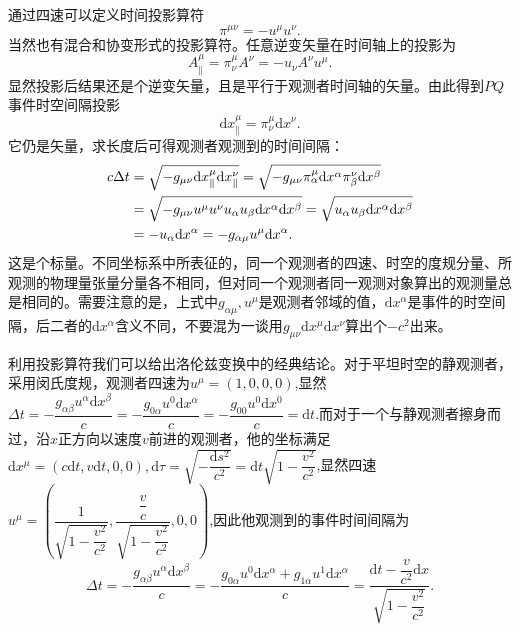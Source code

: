\documentclass[11pt, a4paper, oneside, onecolumn]{ctexart}
\numberwithin{equation}{subsection}
\begin{document}
通过四速可以定义时间投影算符
\begin{equation}
\pi^{\mu\nu}=-u^{\mu}u^{\nu}.
\end{equation}
当然也有混合和协变形式的投影算符。任意逆变矢量在时间轴上的投影为
\begin{equation}
A^{\mu}_{\parallel}=\pi^{\mu}_{\nu}A^{\nu}=-u_{\nu}A^{\nu}u^{\mu}.
\end{equation}
显然投影后结果还是个逆变矢量，且是平行于观测者时间轴的矢量。由此得到$PQ$事件时空间隔投影
\begin{equation}
\mathrm{d}x^{\mu}_{\parallel}=\pi^{\mu}_{\nu}\mathrm{d}x^{\nu}.
\end{equation}
它仍是矢量，求长度后可得观测者观测到的时间间隔：
\begin{align}
c\Delta{}t&=\sqrt{-g_{\mu\nu}\mathrm{d}x^{\mu}_{\parallel}\mathrm{d}x^{\nu}_{\parallel}}=\sqrt{-g_{\mu\nu}\pi^{\mu}_{\alpha}\mathrm{d}x^{\alpha}\pi^{\nu}_{\beta}\mathrm{d}x^{\beta}}\notag\\
&=\sqrt{-g_{\mu\nu}u^{\mu}u^{\nu}u_{\alpha}u_{\beta}\mathrm{d}x^{\alpha}\mathrm{d}x^{\beta}}=\sqrt{u_{\alpha}u_{\beta}\mathrm{d}x^{\alpha}\mathrm{d}x^{\beta}}\notag\\
&=-u_{\alpha}\mathrm{d}x^{\alpha}=-g_{\alpha\mu}u^{\mu}\mathrm{d}x^{\alpha}.
\end{align}
这是个标量。不同坐标系中所表征的，同一个观测者的四速、时空的度规分量、所观测的物理量张量分量各不相同，但对同一个观测者同一观测对象算出的观测量总是相同的。需要注意的是，上式中$g_{\alpha\mu},u^{\mu}$是观测者邻域的值，$\mathrm{d}x^{\alpha}$是事件的时空间隔，后二者的$\mathrm{d}x^{\alpha}$含义不同，不要混为一谈用$g_{\mu\nu}\mathrm{d}x^{\mu}\mathrm{d}x^{\nu}$算出个$-c^{2}$出来。

利用投影算符我们可以给出洛伦兹变换中的经典结论。对于平坦时空的静观测者，采用闵氏度规，观测者四速为$u^{\mu}=\left(1,0,0,0\right)$,显然$\Delta{}t=-\dfrac{g_{\alpha\beta}u^{\alpha}\mathrm{d}x^{\beta}}{c}=-\dfrac{g_{0\alpha}u^{0}\mathrm{d}x^{\alpha}}{c}=-\dfrac{g_{00}u^{0}\mathrm{d}x^{0}}{c}=\mathrm{d}t$.而对于一个与静观测者擦身而过，沿$x$正方向以速度$v$前进的观测者，他的坐标满足$\mathrm{d}x^{\mu}=\left(c\mathrm{d}t,v\mathrm{d}t,0,0\right),\mathrm{d}\tau=\sqrt{-\dfrac{\mathrm{d}s^{2}}{c^{2}}}=\mathrm{d}t\sqrt{1-\dfrac{v^{2}}{c^{2}}}$,显然四速$u^{\mu}=\left(\dfrac{1}{\sqrt{1-\dfrac{v^{2}}{c^{2}}}},\dfrac{\dfrac{v}{c}}{\sqrt{1-\dfrac{v^{2}}{c^{2}}}},0,0\right)$,因此他观测到的事件时间间隔为
\begin{equation}
\Delta{}t=-\frac{g_{\alpha\beta}u^{\alpha}\mathrm{d}x^{\beta}}{c}=-\frac{g_{0\alpha}u^{0}\mathrm{d}x^{\alpha}+g_{1\alpha}u^{1}\mathrm{d}x^{\alpha}}{c}=\frac{\mathrm{d}t-\dfrac{v}{c^{2}}\mathrm{d}x}{\sqrt{1-\dfrac{v^{2}}{c^{2}}}}.
\end{equation}
\end{document}

